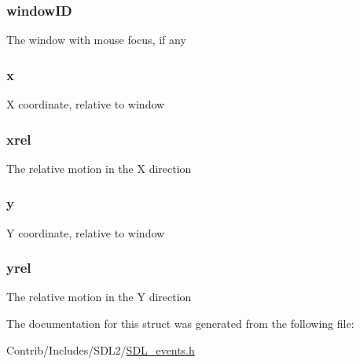\subsubsection[{\texorpdfstring{window\+ID}{windowID}}]{ window\+ID}\hypertarget{struct_s_d_l___mouse_motion_event_a78d9995068d6f40cd78bb8db7351b0a1}{}\label{struct_s_d_l___mouse_motion_event_a78d9995068d6f40cd78bb8db7351b0a1}
The window with mouse focus, if any 
\subsubsection[{\texorpdfstring{x}{x}}]{ x}\hypertarget{struct_s_d_l___mouse_motion_event_a133a64253d58ecff038d427c70b5b0aa}{}\label{struct_s_d_l___mouse_motion_event_a133a64253d58ecff038d427c70b5b0aa}
X coordinate, relative to window 
\subsubsection[{\texorpdfstring{xrel}{xrel}}]{ xrel}\hypertarget{struct_s_d_l___mouse_motion_event_a55969edcb446cbb76fe0af1c1965c748}{}\label{struct_s_d_l___mouse_motion_event_a55969edcb446cbb76fe0af1c1965c748}
The relative motion in the X direction 
\subsubsection[{\texorpdfstring{y}{y}}]{ y}\hypertarget{struct_s_d_l___mouse_motion_event_ae6c55103b58b9a5b746ae4f6fbc9c901}{}\label{struct_s_d_l___mouse_motion_event_ae6c55103b58b9a5b746ae4f6fbc9c901}
Y coordinate, relative to window 
\subsubsection[{\texorpdfstring{yrel}{yrel}}]{ yrel}\hypertarget{struct_s_d_l___mouse_motion_event_af5546043bbf1513acaf93d7e04e6f948}{}\label{struct_s_d_l___mouse_motion_event_af5546043bbf1513acaf93d7e04e6f948}
The relative motion in the Y direction 

The documentation for this struct was generated from the following file\+:\begin{DoxyCompactItemize}
\item 
Contrib/\+Includes/\+S\+D\+L2/\hyperlink{_s_d_l__events_8h}{S\+D\+L\+\_\+events.\+h}\end{DoxyCompactItemize}
